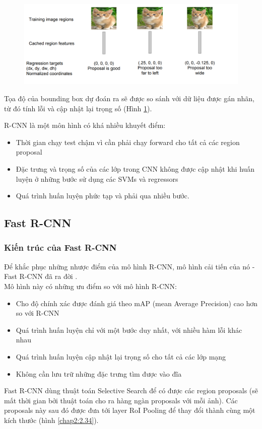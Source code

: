 \begin{enumerate}
\begin{center}
\begin{figure}[H]
	    \centering
	    \includegraphics[width=0.8\columnwidth]{images/chap2/rcnn_5.png}
	    \label{fig:2.33}
	    \end{figure}
	\end{center}
	Tọa độ của bounding box dự đoán ra sẽ được so sánh với dữ liệu được gán nhãn, từ đó tính lỗi và cập nhật lại trọng số (Hình \ref{fig:2.33}).
\end{enumerate}
R-CNN là một môn hình có khá nhiều khuyết điểm:
\begin{itemize}
	\item Thời gian chạy test chậm vì cần phải chạy forward cho tất cả các region proposal
	\item Đặc trưng và trọng số của các lớp trong CNN không được cập nhật khi huấn luyện ở những bước sử dụng các SVMs và regressors
	\item Quá trình huấn luyện phức tạp và phải qua nhiều bước.
\end{itemize}
\subsection{Fast R-CNN}
\subsubsection{Kiến trúc của Fast R-CNN}
	Để khắc phục những nhược điểm của mô hình R-CNN, mô hình cải tiến của nó - Fast R-CNN đã ra đời \cite{girshick2015fast}. \\
Mô hình này có những ưu điểm so với mô hình R-CNN:
\begin{itemize}
	\item Cho độ chính xác được đánh giá theo mAP (mean Average Precision) cao hơn so với R-CNN
	\item Quá trình huấn luyện chỉ với một bước duy nhất, với nhiều hàm lỗi khác nhau
	\item Quá trình huấn luyện cập nhật lại trọng số cho tất cả các lớp mạng
	\item Không cần lưu trữ những đặc trưng tìm được vào đĩa
\end{itemize}
Fast R-CNN dùng thuật toán Selective Search để có được các region proposals (sẽ mất thời gian bởi thuật toán cho ra hàng ngàn proposals với mỗi ảnh). Các proposals này sau đó được đưa tới layer RoI Pooling để thay đổi thành cùng một kích thước (hình \ref{chap2:2.34}).  

